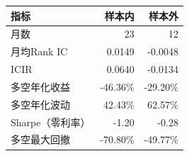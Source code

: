 \begin{tabular}{@{}lrr@{}}
\toprule
指标 & 样本内 & 样本外 \\
\midrule
月数 & 23 & 12 \\
月均Rank IC & 0.0149 & -0.0048 \\
ICIR & 0.0640 & -0.0134 \\
多空年化收益 & -46.36\% & -29.20\% \\
多空年化波动 & 42.43\% & 62.57\% \\
Sharpe（零利率） & -1.20 & -0.28 \\
多空最大回撤 & -70.80\% & -49.77\% \\
\bottomrule
\end{tabular}
